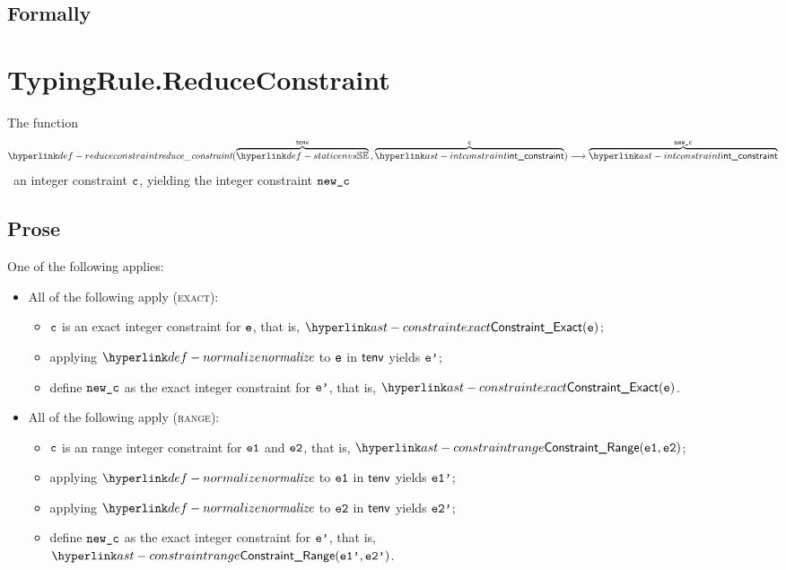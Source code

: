 
\subsection{Formally}

\section{TypingRule.ReduceConstraint \label{sec:TypingRule.ReduceConstraint}}
\hypertarget{def-reduceconstraint}{}
The function
\[
\reduceconstraint(
  \overname{\staticenvs}{\tenv} \aslsep
  \overname{\intconstraint}{\vc}
) \aslto
\overname{\intconstraint}{\newc}
\]
\symbolicallysimplifies\ an integer constraint $\texttt{c}$, yielding the integer constraint $\texttt{new\_c}$

\subsection{Prose}
One of the following applies:
\begin{itemize}
  \item All of the following apply (\textsc{exact}):
  \begin{itemize}
    \item $\texttt{c}$ is an exact integer constraint for $\texttt{e}$, that is, $\ConstraintExact(\ve)$;
    \item applying $\normalize$ to $\texttt{e}$ in $\textsf{tenv}$ yields $\texttt{e'}$;
    \item define $\texttt{new\_c}$ as the exact integer constraint for $\texttt{e'}$, that is, $\ConstraintExact(\ve)$.
  \end{itemize}

  \item All of the following apply (\textsc{range}):
  \begin{itemize}
    \item $\texttt{c}$ is an range integer constraint for $\texttt{e1}$ and $\texttt{e2}$, that is, $\ConstraintRange(\veone, \vetwo)$;
    \item applying $\normalize$ to $\texttt{e1}$ in $\textsf{tenv}$ yields $\texttt{e1'}$;
    \item applying $\normalize$ to $\texttt{e2}$ in $\textsf{tenv}$ yields $\texttt{e2'}$;
    \item define $\texttt{new\_c}$ as the exact integer constraint for $\texttt{e'}$, that is, \\ $\ConstraintRange(\veonep, \vetwop)$.
  \end{itemize}
\end{itemize}

